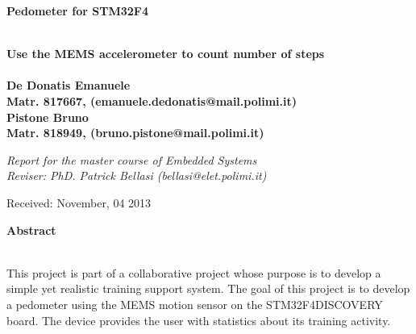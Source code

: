 \documentclass[a4paper,10pt]{article}
\newenvironment*{mytitle}{\begin{LARGE}\bf}{\end{LARGE}\\}%
\newenvironment*{mysubtitle}{\bf}{\\[1.5ex]}%
\newenvironment*{myabstract}{\begin{Large}\bf}{\end{Large}\\[2.5ex]}%
\begin{document}
\begin{mytitle}Pedometer for STM32F4\end{mytitle}
\begin{mysubtitle}Use the MEMS accelerometer to count number of steps\end{mysubtitle}
%
%
\\
De Donatis Emanuele\\
Matr. 817667, (emanuele.dedonatis@mail.polimi.it)\\
\hspace{10ex}
Pistone Bruno\\
Matr. 818949, (bruno.pistone@mail.polimi.it)\\
\begin{flushright}
\emph{Report for the master course of Embedded Systems}\\
\emph{Reviser: PhD. Patrick Bellasi (bellasi@elet.polimi.it)}
\end{flushright}

Received: November, 04 2013\\
\hspace{10ex}

\begin{myabstract} Abstract \end{myabstract}
This project is part of a collaborative project whose purpose is to develop a simple 
yet realistic training support system. The goal of this project is to develop a pedometer 
using the MEMS motion sensor on the STM32F4DISCOVERY board. The device provides
the user with statistics about its training activity.\cite{Norman09Learn}
\end{document}
